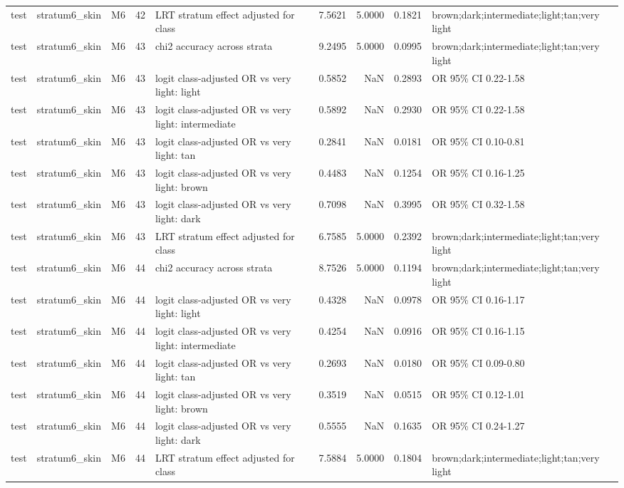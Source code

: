 \begin{tabular}{lllrlrrrl}
test & stratum6\_skin & M6 & 42 & LRT stratum effect adjusted for class & 7.5621 & 5.0000 & 0.1821 & brown;dark;intermediate;light;tan;very light \\
test & stratum6\_skin & M6 & 43 & chi2 accuracy across strata & 9.2495 & 5.0000 & 0.0995 & brown;dark;intermediate;light;tan;very light \\
test & stratum6\_skin & M6 & 43 & logit class-adjusted OR vs very light: light & 0.5852 & NaN & 0.2893 & OR 95\% CI 0.22-1.58 \\
test & stratum6\_skin & M6 & 43 & logit class-adjusted OR vs very light: intermediate & 0.5892 & NaN & 0.2930 & OR 95\% CI 0.22-1.58 \\
test & stratum6\_skin & M6 & 43 & logit class-adjusted OR vs very light: tan & 0.2841 & NaN & 0.0181 & OR 95\% CI 0.10-0.81 \\
test & stratum6\_skin & M6 & 43 & logit class-adjusted OR vs very light: brown & 0.4483 & NaN & 0.1254 & OR 95\% CI 0.16-1.25 \\
test & stratum6\_skin & M6 & 43 & logit class-adjusted OR vs very light: dark & 0.7098 & NaN & 0.3995 & OR 95\% CI 0.32-1.58 \\
test & stratum6\_skin & M6 & 43 & LRT stratum effect adjusted for class & 6.7585 & 5.0000 & 0.2392 & brown;dark;intermediate;light;tan;very light \\
test & stratum6\_skin & M6 & 44 & chi2 accuracy across strata & 8.7526 & 5.0000 & 0.1194 & brown;dark;intermediate;light;tan;very light \\
test & stratum6\_skin & M6 & 44 & logit class-adjusted OR vs very light: light & 0.4328 & NaN & 0.0978 & OR 95\% CI 0.16-1.17 \\
test & stratum6\_skin & M6 & 44 & logit class-adjusted OR vs very light: intermediate & 0.4254 & NaN & 0.0916 & OR 95\% CI 0.16-1.15 \\
test & stratum6\_skin & M6 & 44 & logit class-adjusted OR vs very light: tan & 0.2693 & NaN & 0.0180 & OR 95\% CI 0.09-0.80 \\
test & stratum6\_skin & M6 & 44 & logit class-adjusted OR vs very light: brown & 0.3519 & NaN & 0.0515 & OR 95\% CI 0.12-1.01 \\
test & stratum6\_skin & M6 & 44 & logit class-adjusted OR vs very light: dark & 0.5555 & NaN & 0.1635 & OR 95\% CI 0.24-1.27 \\
test & stratum6\_skin & M6 & 44 & LRT stratum effect adjusted for class & 7.5884 & 5.0000 & 0.1804 & brown;dark;intermediate;light;tan;very light \\

\end{tabular}
